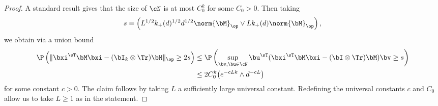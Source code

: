 \begin{proof}
A standard result \cite{vershynin2018high} gives that the size of $\cN$ is at most $C_0^k$ for some $C_0 > 0$. Then taking 
\begin{equation*}
    s = 
 \left( L^{1/2} k_+(d)^{1/2} d^{1/2} \norm{\bM}_\op \vee L k_+(d) \norm{\bM}_\op \right),
\end{equation*}
we obtain via a union bound
\begin{align*}
    \P\left(\|\bxi^\sT\bM\bxi - (\bI_k\otimes\Tr)\bM\|_\op \ge 2 s \right)
    &\le 
    \P\left( \sup_{\bv,\bu\in\cN} \bu^\sT(\bxi^\sT\bM\bxi - (\bI\otimes\Tr)\bM) \bv \ge s  \right)\\
    &\le 2C_0^k \big (e^{-c L k}\wedge d^{-cL}\big)
\end{align*}
%
for some constant $c>0$. The claim follows by taking $L$ a sufficiently large universal constant. 
Redefining the universal constants $c$ and $C_0$ allow us to take $L\ge 1$ as in the statement.

\end{proof}

